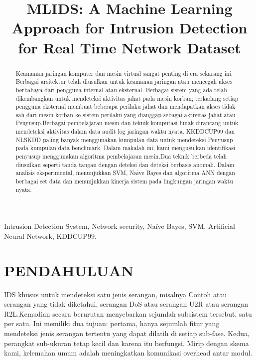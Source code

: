 \documentclass[conference]{IEEEtran}
\begin{document}
\title{MLIDS: A Machine Learning Approach for Intrusion Detection for Real Time Network Dataset}

\author{
}

\maketitle

\begin{abstract}
Keamanan jaringan komputer dan mesin virtual sangat penting di era sekarang ini. Berbagai arsitektur telah diusulkan untuk keamanan jaringan atau mencegah akses berbahaya dari pengguna internal atau eksternal. Berbagai sistem yang ada telah dikembangkan untuk mendeteksi aktivitas jahat pada mesin korban; terkadang setiap pengguna eksternal membuat beberapa perilaku jahat dan mendapatkan akses tidak sah dari mesin korban ke sistem perilaku yang dianggap sebagai aktivitas jahat atau Penyusup.Berbagai pembelajaran mesin dan teknik komputasi lunak dirancang untuk mendeteksi aktivitas dalam data audit log jaringan waktu nyata. KKDDCUP99 dan NLSKDD paling banyak menggunakan kumpulan data untuk mendeteksi Penyusup pada kumpulan data benchmark. Dalam makalah ini, kami mengusulkan identifikasi penyusup menggunakan algoritma pembelajaran mesin.Dua teknik berbeda telah diusulkan seperti tanda tangan dengan deteksi dan deteksi berbasis anomali. Dalam analisis eksperimental, menunjukkan SVM, Naive Bayes dan algoritma ANN dengan berbagai set data dan menunjukkan kinerja sistem pada lingkungan jaringan waktu nyata.
\end{abstract}

\begin{IEEEkeywords}
Intrusion Detection System, Network security, Naïve Bayes, SVM, Artificial Neural Network, KDDCUP99.
\end{IEEEkeywords}

\section{PENDAHULUAN}
IDS khusus untuk mendeteksi satu jenis serangan,
misalnya Contoh atau serangan yang tidak diketahui, serangan DoS atau serangan U2R atau serangan R2L.Kemudian secara berurutan menyebarkan sejumlah subsistem tersebut, satu per satu. Ini memiliki dua tujuan: pertama, hanya sejumlah fitur yang mendeteksi jenis serangan tertentu yang dapat dilatih di setiap sub-fase. Kedua, perangkat sub-ukuran tetap kecil dan karena itu berfungsi. Mirip dengan skema kami, kelemahan umum adalah meningkatkan komunikasi overhead antar modul.
\end{document}

